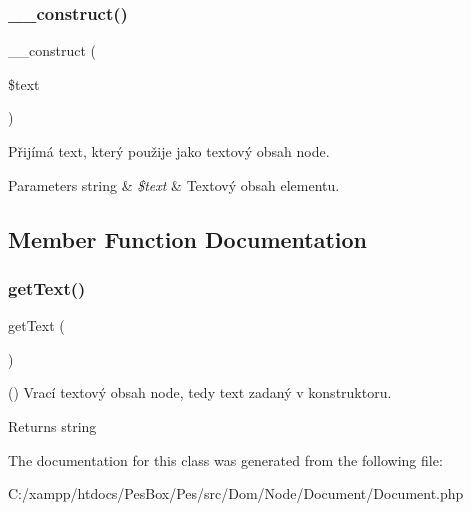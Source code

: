 \subsubsection{\texorpdfstring{\+\_\+\+\_\+construct()}{\_\_construct()}}
{\footnotesize\ttfamily \+\_\+\+\_\+construct (\begin{DoxyParamCaption}\item[{}]{\$text }\end{DoxyParamCaption})}

Přijímá text, který použije jako textový obsah node. 
\begin{DoxyParams}[1]{Parameters}
string & {\em \$text} & Textový obsah elementu. \\
\hline
\end{DoxyParams}


\subsection{Member Function Documentation}
\mbox{\label{class_pes_1_1_dom_1_1_node_1_1_document_1_1_document_a8a2999b1d846c0a7bc77187e28facd99}} 
\subsubsection{\texorpdfstring{get\+Text()}{getText()}}
{\footnotesize\ttfamily get\+Text (\begin{DoxyParamCaption}{ }\end{DoxyParamCaption})}

() Vrací textový obsah node, tedy text zadaný v konstruktoru. \begin{DoxyReturn}{Returns}
string 
\end{DoxyReturn}


The documentation for this class was generated from the following file\+:\begin{DoxyCompactItemize}
\item 
C\+:/xampp/htdocs/\+Pes\+Box/\+Pes/src/\+Dom/\+Node/\+Document/Document.\+php\end{DoxyCompactItemize}
